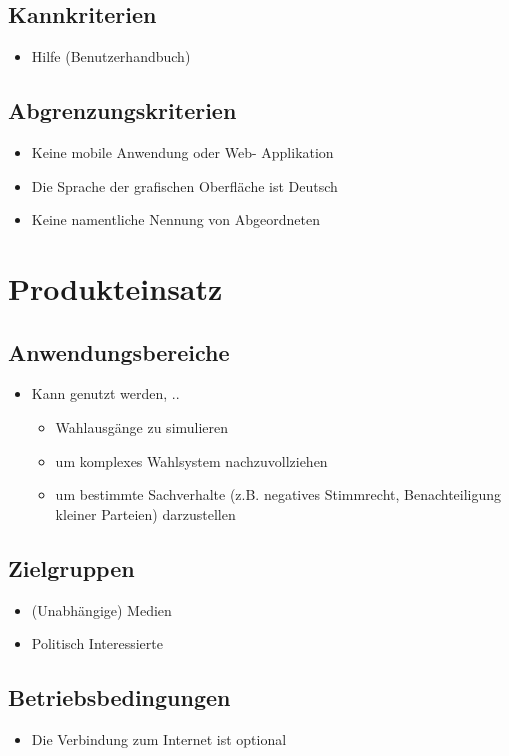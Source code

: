 \documentclass[10pt,a4paper]{article}
\begin{document}
\subsection{Kannkriterien}
\begin{itemize}
\item Hilfe (Benutzerhandbuch)
\end{itemize}


\subsection{Abgrenzungskriterien}
\begin{itemize}
\item Keine mobile Anwendung oder Web- Applikation
\item Die Sprache der grafischen Oberfläche ist Deutsch
\item Keine namentliche Nennung von Abgeordneten
\end{itemize}


\section{Produkteinsatz}
\subsection{Anwendungsbereiche}
\begin{itemize}
\item Kann genutzt werden, ..
\begin{itemize}
\item Wahlausgänge zu simulieren
\item um komplexes Wahlsystem nachzuvollziehen 
\item um bestimmte Sachverhalte (z.B. negatives Stimmrecht, Benachteiligung kleiner Parteien) darzustellen 
\end{itemize} 
\end{itemize}


\subsection{Zielgruppen}
\begin{itemize}
\item (Unabhängige) Medien
\item Politisch Interessierte
\end{itemize}


\subsection{Betriebsbedingungen}
\begin{itemize}
\item Die Verbindung zum Internet ist optional
\end{itemize}
\end{document}
